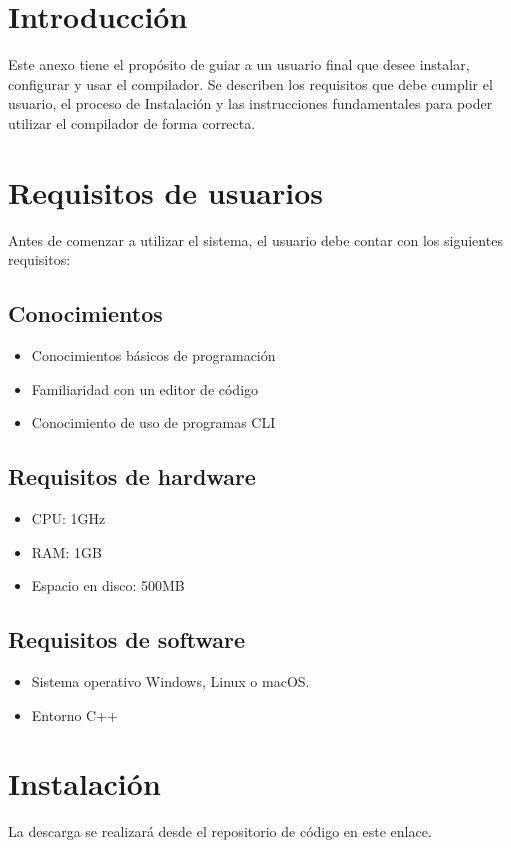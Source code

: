 \section{Introducción}
Este anexo tiene el propósito de guiar a un usuario final que desee instalar, configurar y usar el compilador. Se describen los requisitos que debe cumplir el usuario, el proceso de Instalación y las instrucciones fundamentales para poder utilizar el compilador de forma correcta.

\section{Requisitos de usuarios}
Antes de comenzar a utilizar el sistema, el usuario debe contar con los siguientes requisitos:

\subsection{Conocimientos}
\begin{itemize}
    \item Conocimientos básicos de programación
    \item Familiaridad con un editor de código
    \item Conocimiento de uso de programas CLI
\end{itemize}

\subsection{Requisitos de hardware} 
\begin{itemize}
    \item CPU: 1GHz
    \item RAM: 1GB
    \item Espacio en disco: 500MB
\end{itemize}

\subsection{Requisitos de software} 
\begin{itemize}
    \item Sistema operativo Windows, Linux o macOS.
    \item Entorno C++
\end{itemize}

\section{Instalación}
La descarga se realizará desde el repositorio de código en este enlace. 

